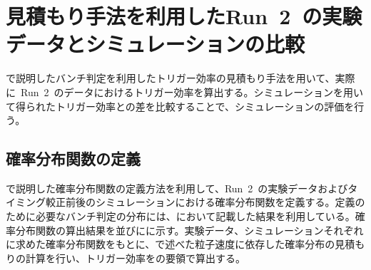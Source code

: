 \section{見積もり手法を利用したRun~2~の実験データとシミュレーションの比較}
で説明したバンチ判定を利用したトリガー効率の見積もり手法を用いて、実際に~Run~2~のデータにおけるトリガー効率を算出する。シミュレーションを用いて得られたトリガー効率との差を比較することで、シミュレーションの評価を行う。
\subsection{確率分布関数の定義}
で説明した確率分布関数の定義方法を利用して、Run~2~の実験データおよびタイミング較正前後のシミュレーションにおける確率分布関数を定義する。定義のために必要なバンチ判定の分布には、において記載した結果を利用している。確率分布関数の算出結果を並びにに示す。実験データ、シミュレーションそれぞれに求めた確率分布関数をもとに、で述べた粒子速度に依存した確率分布の見積もりの計算を行い、トリガー効率をの要領で算出する。

